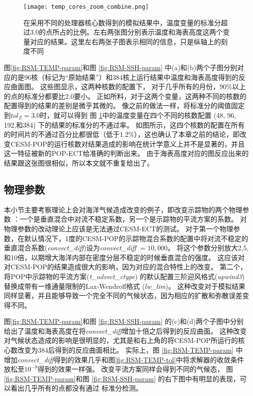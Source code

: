 \begin{figure}[!ht]
\centering
\texttt{[image: temp\_cores\_zoom\_combine.png]}
\caption{
在采用不同的处理器核心数得到的模拟结果中，温度变量的标准分超过3.0的点所占的比例。左右两张图分别表示温度和海表高度这两个变量对应的结果。这里左右两张子图表示相同的信息，只是纵轴上的刻度不同}
\label{fig:combine}
\end{figure}
 
图\ref{fig:RSM-TEMP-param}和图 \ref{fig:RSM-SSH-param} 中(a)和(b)两个子图分别对应的是96核（标记为“原始结果”）和384核上运行结果中温度和海表高度得到的反应曲面图。 
这些图显示，这两种核数的配置下， 对于几乎所有的月份，90\%以上的点的标准分都要比2.0要小。 
正如所料，对于这两个变量，这两种不同的核数的配置得到的结果的差别是微乎其微的。
像之前的做法一样，将标准分的阈值固定到$tol_{Z} =3.0$时，就可以得到 图 \ref{fig:combine}中的温度变量在四个不同的核数配置 (48, 96, 192,和384) 下的结果的标准分的不通过率。
如图所示，这四个核数的配置在所有的时间片的不通过百分比都很低（低于1.2\%），这也确认了本章之前的结论，即改变CESM-POP的运行核数对结果造成的影响在统计学意义上并不是显著的，并且这一特征被新的POP-ECT给准确的判断出来。 
由于海表高度对应的图反应出来的结果跟这张图很相似，所以本文就不重复给出了。

 \subsection{物理参数}\label{verify:pp}


本小节主要考察理论上会对海洋气候造成改变的例子，即改变示踪物的两个物理参数 ：一个是垂直混合中对流不稳定系数，另一个是示踪物的平流方案的系数。
对物理参数的改动理论上应该是无法通过CESM-ECT的测试。
对于第一个物理参数，在默认情况下，1度的CESM-POP的示踪物混合系数的配置中将对流不稳定的垂直混合系数(\textit{convect\_diff})设为\textit{convect\_diff} $= 10,000$。
将这个参数分别放大2,5,和10倍，以期增大海洋内部在密度分层不稳定的时候垂直混合的强度。
这应该对对CESM-POP的结果造成很大的影响，因为对应的混合特性上的改变。
第二个，将POP中示踪物的平流方案(\textit{t\_advect\_ctype}) 的默认配置三阶迎风格式(\textit{upwind3})替换成带有一维通量限制的Lax-Wendroff格式 (\textit{lw\_lim})。
这种改变对于模拟结果同样显著，并且能够导致一个完全不同的气候状态，因为相应的扩散和弥散误差变得不同。


 
图\ref{fig:RSM-TEMP-param}和图 \ref{fig:RSM-SSH-param} 的(c)和(d)两个子图中分别给出了温度和海表高度在将\textit{convect\_diff}增加十倍之后得到的反应曲面。 这种改变对气候状态造成的影响是很明显的，尤其是和右上角的将CESM-POP所运行的核心数改变为384后得到的反应曲面相比。
实际上，图  \ref{fig:RSM-TEMP-param} 中增加\textit{convect\_diff}得到的效果几乎和图\ref{fig:RSM-TEMP-tol}中将求解器的收敛条件放松至$10^{-9}$得到的效果一样强。
改变平流方案同样会得到不同的气候态， 图 \ref{fig:RSM-TEMP-param}和图 \ref{fig:RSM-SSH-param} 的右下图中有明显的表现，可以看出几乎所有的点都没有通过 标准分检测。 


